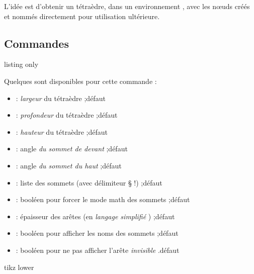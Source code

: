 \begin{tipblock}
L'idée est d'obtenir un tétraèdre, dans un environnement \TikZ, avec les nœuds créés et nommés directement pour utilisation ultérieure.
\end{tipblock}

\subsection{Commandes}

\begin{PresCodeTexPL}{listing only}
\end{PresCodeTexPL}

\begin{cautionblock}
Quelques  sont disponibles pour cette commande :

\begin{itemize}
	\item {} : \textit{largeur} du tétraèdre ;\hfill{}défaut 
	\item {} : \textit{profondeur} du tétraèdre ;\hfill{}défaut 
	\item {} : \textit{hauteur} du tétraèdre ;\hfill{}défaut 
	\item {} : angle \textit{du sommet de devant} ;\hfill{}défaut 
	\item {} : angle \textit{du sommet du haut} ;\hfill{}défaut 
	\item {} : liste des sommets (avec délimiteur § !) ;\hfill{}défaut 
	\item {} : booléen pour forcer le mode math des sommets ;\hfill{}défaut 
	\item {} : épaisseur des arêtes (en \textit{langage simplifié} \TikZ) ;\hfill{}défaut 
	\item {} : booléen pour afficher les noms des sommets ;\hfill{}défaut 
	\item {} : booléen pour ne pas afficher l'arête \textit{invisible} .\hfill{}défaut 
\end{itemize}
\vspace*{-\baselineskip}\leavevmode
\end{cautionblock}

\begin{PresCodePL}{tikz lower}
\TetraedreTikz
\end{PresCodePL}

